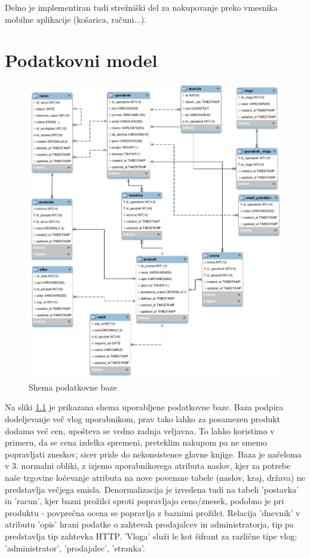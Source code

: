 \documentclass[a4paper,12pt]{report}
\begin{document}
Delno je implementiran tudi strežniški del za nakupovanje preko vmesnika mobilne aplikacije (košarica, računi...).


\chapter{Podatkovni model}

\begin{figure}
    \centering
    \includegraphics[width=\textwidth]{slike/spletna_trgovina.png}
    \caption{Shema podatkovne baze}
    \label{fig:spletna_trgovina_db}
\end{figure}

Na sliki \ref{fig:spletna_trgovina_db} je prikazana shema uporabljene podatkovne baze. Baza podpira dodeljevanje več vlog uporabnikom, prav tako lahko za posamezen produkt dodamo več cen, upošteva se vedno zadnja veljavna. To lahko koristimo v primeru, da se cena izdelka spremeni, preteklim nakupom pa ne smemo popravljati zneskov, sicer pride do nekonsistence glavne knjige. Baza je načeloma v 3. normalni obliki, z izjemo uporabnikovega atributa naslov, kjer za potrebe naše trgovine ločevanje atributa na nove povezane tabele (naslov, kraj, država) ne predstavlja večjega smisla. Denormalizacija je izvedena tudi na tabeli 'postavka' in 'racun', kjer bazni prožilci sproti popravljajo ceno/znesek, podobno je pri produktu - povprečna ocena se popravlja z baznimi prožilci. 
Relacija 'dnevnik' v atributu 'opis' hrani podatke o zahtevah prodajalcev in administratorja, tip pa predstavlja tip zahtevka HTTP. 'Vloga' služi le kot šifrant za različne tipe vlog: 'administrator', 'prodajalec', 'stranka'.
\end{document}

